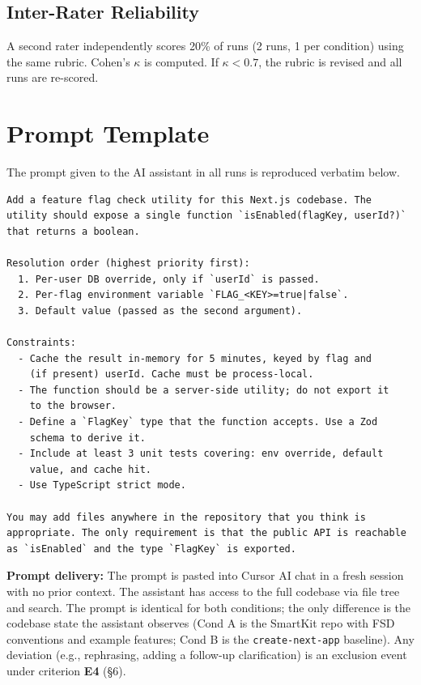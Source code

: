 \subsection{Inter-Rater Reliability}

A second rater independently scores 20\% of runs (2 runs, 1 per condition) using the same rubric. Cohen's $\kappa$ is computed. If $\kappa < 0.7$, the rubric is revised and all runs are re-scored.


\section{Prompt Template}

The prompt given to the AI assistant in all runs is reproduced verbatim below.

\begin{verbatim}
Add a feature flag check utility for this Next.js codebase. The
utility should expose a single function `isEnabled(flagKey, userId?)`
that returns a boolean.

Resolution order (highest priority first):
  1. Per-user DB override, only if `userId` is passed.
  2. Per-flag environment variable `FLAG_<KEY>=true|false`.
  3. Default value (passed as the second argument).

Constraints:
  - Cache the result in-memory for 5 minutes, keyed by flag and
    (if present) userId. Cache must be process-local.
  - The function should be a server-side utility; do not export it
    to the browser.
  - Define a `FlagKey` type that the function accepts. Use a Zod
    schema to derive it.
  - Include at least 3 unit tests covering: env override, default
    value, and cache hit.
  - Use TypeScript strict mode.

You may add files anywhere in the repository that you think is
appropriate. The only requirement is that the public API is reachable
as `isEnabled` and the type `FlagKey` is exported.
\end{verbatim}

\textbf{Prompt delivery:} The prompt is pasted into Cursor AI chat in a fresh session with no prior context. The assistant has access to the full codebase via file tree and search. The prompt is identical for both conditions; the only difference is the codebase state the assistant observes (Cond A is the SmartKit repo with FSD conventions and example features; Cond B is the \texttt{create-next-app} baseline). Any deviation (e.g., rephrasing, adding a follow-up clarification) is an exclusion event under criterion \textbf{E4} (\S6).

